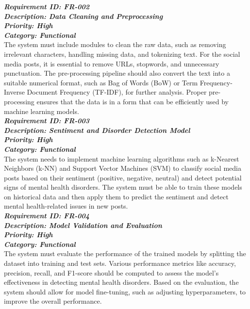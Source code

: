 \noindent
\textbf{\emph{Requirement ID: FR-002}} \\ 
\textbf{\emph{Description: Data Cleaning and Preprocessing}} \\
\textbf{\emph{Priority: High}} \\
\textbf{\emph{Category: Functional}} \\
\noindent
The system must include modules to clean the raw data, such as removing irrelevant characters, handling missing data, and tokenizing text. For the social media posts, it is essential to remove URLs, stopwords, and unnecessary punctuation. The pre-processing pipeline should also convert the text into a suitable numerical format, such as Bag of Words (BoW) or Term Frequency-Inverse Document Frequency (TF-IDF), for further analysis. Proper pre-processing ensures that the data is in a form that can be efficiently used by machine learning models. \\

\noindent
\textbf{\emph{Requirement ID: FR-003}} \\ 
\textbf{\emph{Description: Sentiment and Disorder Detection Model}} \\
\textbf{\emph{Priority: High}} \\
\textbf{\emph{Category: Functional}} \\
\noindent
The system needs to implement machine learning algorithms such as k-Nearest Neighbors (k-NN) and Support Vector Machines (SVM) to classify social media posts based on their sentiment (positive, negative, neutral) and detect potential signs of mental health disorders. The system must be able to train these models on historical data and then apply them to predict the sentiment and detect mental health-related issues in new posts. \\

\noindent
\textbf{\emph{Requirement ID: FR-004}} \\ 
\textbf{\emph{Description: Model Validation and Evaluation}} \\
\textbf{\emph{Priority: High}} \\
\textbf{\emph{Category: Functional}} \\
\noindent
The system must evaluate the performance of the trained models by splitting the dataset into training and test sets. Various performance metrics like accuracy, precision, recall, and F1-score should be computed to assess the model’s effectiveness in detecting mental health disorders. Based on the evaluation, the system should allow for model fine-tuning, such as adjusting hyperparameters, to improve the overall performance. 


